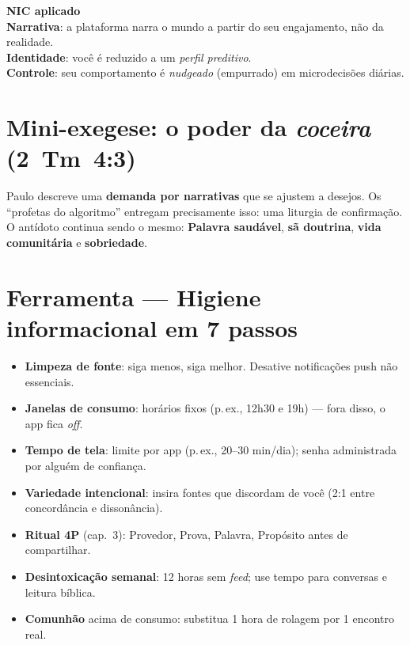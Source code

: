 \begin{nicbox}
\textbf{NIC aplicado}\\
\textbf{Narrativa}: a plataforma narra o mundo a partir do seu engajamento, não da realidade.\\
\textbf{Identidade}: você é reduzido a um \emph{perfil preditivo}.\\
\textbf{Controle}: seu comportamento é \emph{nudgeado} (empurrado) em microdecisões diárias.
\end{nicbox}

\section{Mini-exegese: o poder da \textit{coceira} (2~Tm~4:3)}
Paulo descreve uma \textbf{demanda por narrativas} que se ajustem a desejos. Os ``profetas do algoritmo'' entregam precisamente isso: uma liturgia de confirmação. O antídoto continua sendo o mesmo: \textbf{Palavra saudável}, \textbf{sã doutrina}, \textbf{vida comunitária} e \textbf{sobriedade}.

\section{Ferramenta --- Higiene informacional em 7 passos}
\begin{checklist}
\begin{itemize}[leftmargin=*,noitemsep]
  \item \textbf{Limpeza de fonte}: siga menos, siga melhor. Desative notificações push não essenciais.
  \item \textbf{Janelas de consumo}: horários fixos (p.\,ex., 12h30 e 19h) --- fora disso, o app fica \emph{off}.
  \item \textbf{Tempo de tela}: limite por app (p.\,ex., 20--30 min/dia); senha administrada por alguém de confiança.
  \item \textbf{Variedade intencional}: insira fontes que discordam de você (2:1 entre concordância e dissonância).
  \item \textbf{Ritual 4P} (cap.~3): Provedor, Prova, Palavra, Propósito antes de compartilhar.
  \item \textbf{Desintoxicação semanal}: 12 horas sem \emph{feed}; use tempo para conversas e leitura bíblica.
  \item \textbf{Comunhão} acima de consumo: substitua 1 hora de rolagem por 1 encontro real.
\end{itemize}
\end{checklist}

